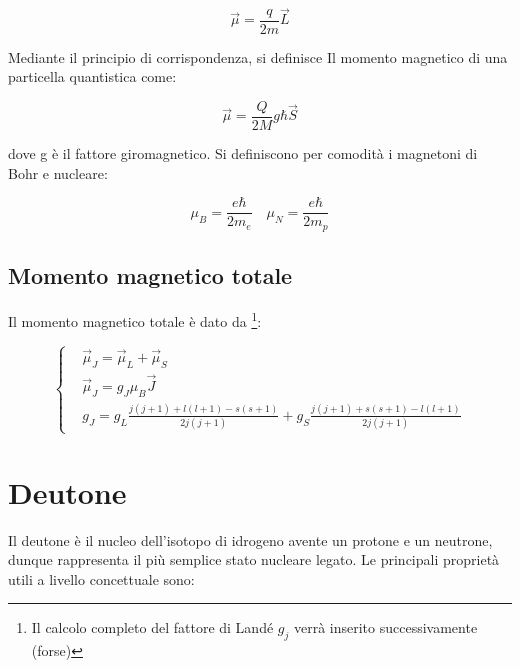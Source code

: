 \documentclass{article}
\begin{document}
\begin{equation}
    \vec{\mu}=\frac{q}{2m}\vec{L}
\end{equation}

Mediante il principio di corrispondenza, si definisce Il momento magnetico di una particella quantistica come:

\begin{equation}
    \vec{\mu}=\frac{Q}{2M}g\hbar\vec{S}
\end{equation}

dove g è il fattore giromagnetico.
Si definiscono per comodità i magnetoni di Bohr e nucleare:

\begin{equation}
    \mu_B=\frac{e\hbar}{2m_e} \quad \mu_N=\frac{e\hbar}{2m_p}
\end{equation}

\subsection{Momento magnetico totale}
Il momento magnetico totale è dato da \footnote{Il calcolo completo del fattore di Landé $g_j$ verrà inserito successivamente (forse)}:

\begin{equation}
    \left\{
    \begin{aligned}
         & \vec{\mu}_J=\vec{\mu}_L+\vec{\mu}_S                                                  \\
         & \vec{\mu}_J=g_J\mu_B\vec{J}                                                          \\
         & g_J= g_L\frac{j(j+1)+l(l+1)-s(s+1)}{2j(j+1)}+g_S\frac{j(j+1)+s(s+1)-l(l+1)}{2j(j+1)}
    \end{aligned}
    \right.
\end{equation}

\section{Deutone}
Il deutone è il nucleo dell'isotopo di idrogeno avente un protone e un neutrone, dunque rappresenta il più semplice stato nucleare legato.
Le principali proprietà utili a livello concettuale sono:
\end{document}

